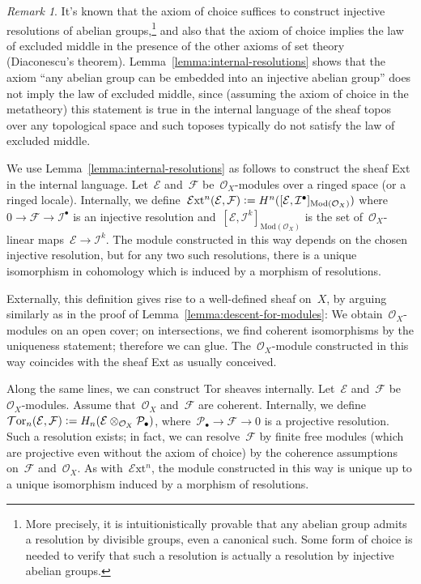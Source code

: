 \documentclass[10pt,reqno,a4paper]{amsbook}
\theoremstyle{definition}
\theoremstyle{plain}
\theoremstyle{remark}
\newtheorem{rem}[defn]{Remark}
\newcommand{\E}{\mathcal{E}}
\newcommand{\F}{\mathcal{F}}
\renewcommand{\O}{\mathcal{O}}
\renewcommand{\P}{\mathcal{P}}
\newcommand{\I}{\mathcal{I}}
\newcommand{\EXT}{\mathcal{E}\mathrm{xt}}
\newcommand{\TOR}{\mathcal{T}\mathrm{or}}
\newcommand{\Mod}{\mathrm{Mod}}
\newcommand{\?}{\,{:}\,}
\renewcommand{\_}{\mathpunct{.}\,}
\newcommand{\defeq}{\vcentcolon=}
\begin{document}
\begin{rem}It's known that the axiom of choice suffices to construct injective
resolutions of abelian groups,\footnote{More precisely, it is intuitionistically
provable that any abelian group admits a resolution by divisible groups, even a
canonical such. Some form of choice is needed to verify that such a resolution
is actually a resolution by injective abelian groups.}
and also that the axiom of choice implies the law of excluded middle in the
presence of the other axioms of set theory (Diaconescu's theorem).
Lemma~\ref{lemma:internal-resolutions} shows that the axiom ``any abelian group
can be embedded into an injective abelian group'' does not imply the law of
excluded middle, since (assuming the axiom of choice in the metatheory) this
statement is true in the internal language of the sheaf topos over any
topological space and such toposes typically do not satisfy the law of excluded
middle.
\end{rem}

We use Lemma~\ref{lemma:internal-resolutions} as follows to construct the sheaf
Ext in the internal language. Let~$\E$ and~$\F$ be~$\O_X$-modules over a ringed
space (or a ringed locale). Internally, we define~$\EXT^n(\E,\F) \defeq
H^n([\E,\I^\bullet]_{\Mod(\O_X)})$ where~$0 \to \F \to \I^\bullet$ is an
injective resolution and~$[\E,\I^k]_{\Mod(\O_X)}$ is the set of~$\O_X$-linear
maps~$\E \to \I^k$. The module constructed in this way depends on the chosen
injective resolution, but for any two such resolutions, there is a unique
isomorphism in cohomology which is induced by a morphism of resolutions.

Externally, this definition gives rise to a well-defined sheaf on~$X$, by
arguing similarly as in the proof of Lemma~\ref{lemma:descent-for-modules}: We
obtain~$\O_X$-modules on an open cover; on intersections, we find coherent
isomorphisms by the uniqueness statement; therefore we can glue.
The~$\O_X$-module constructed in this way coincides with the sheaf Ext as
usually conceived.

Along the same lines, we can construct Tor sheaves internally. Let~$\E$
and~$\F$ be~$\O_X$-modules. Assume that~$\O_X$ and~$\F$ are coherent. Internally, we
define~$\TOR_n(\E,\F) \defeq H_n(\E \otimes_{\O_X} \P_\bullet)$,
where~$\P_\bullet \to \F \to 0$ is a projective resolution.
Such a resolution exists; in fact, we can resolve~$\F$ by
finite free modules (which are projective even without the axiom of choice) by
the coherence assumptions on~$\F$ and~$\O_X$. As
with~$\EXT^n$, the module constructed in this way is unique up to a unique
isomorphism induced by a morphism of resolutions.
\end{document}
